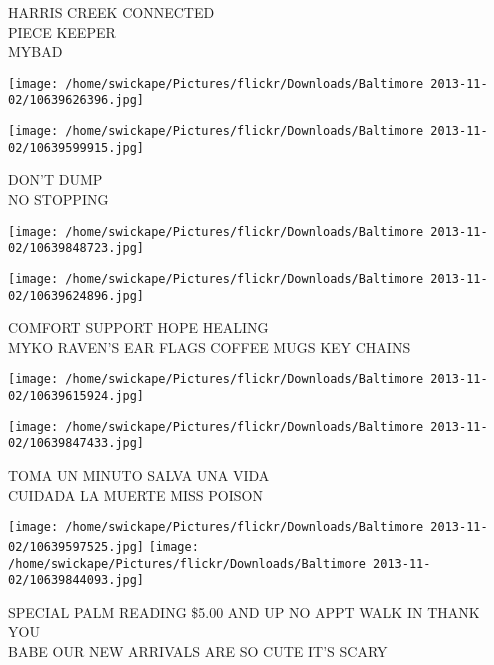 \documentclass[10pt,letterpaper]{article}
\begin{document}
HARRIS CREEK CONNECTED\\
PIECE KEEPER\\
MYBAD
\pagebreak

\texttt{[image: /home/swickape/Pictures/flickr/Downloads/Baltimore 2013-11-02/10639626396.jpg]}

\vspace{0.25in}
\texttt{[image: /home/swickape/Pictures/flickr/Downloads/Baltimore 2013-11-02/10639599915.jpg]}

DON'T DUMP\\
NO STOPPING
\pagebreak

\texttt{[image: /home/swickape/Pictures/flickr/Downloads/Baltimore 2013-11-02/10639848723.jpg]}

\vspace{0.25in}
\texttt{[image: /home/swickape/Pictures/flickr/Downloads/Baltimore 2013-11-02/10639624896.jpg]}

COMFORT SUPPORT HOPE HEALING\\
MYKO RAVEN'S EAR FLAGS COFFEE MUGS KEY CHAINS
\pagebreak

\texttt{[image: /home/swickape/Pictures/flickr/Downloads/Baltimore 2013-11-02/10639615924.jpg]}

\vspace{0.25in}
\texttt{[image: /home/swickape/Pictures/flickr/Downloads/Baltimore 2013-11-02/10639847433.jpg]}

TOMA UN MINUTO SALVA UNA VIDA\\
CUIDADA LA MUERTE MISS POISON
\pagebreak

\texttt{[image: /home/swickape/Pictures/flickr/Downloads/Baltimore 2013-11-02/10639597525.jpg]}
\texttt{[image: /home/swickape/Pictures/flickr/Downloads/Baltimore 2013-11-02/10639844093.jpg]}

SPECIAL PALM READING \$5.00 AND UP NO APPT WALK IN THANK YOU\\
BABE OUR NEW ARRIVALS ARE SO CUTE IT'S SCARY
\pagebreak
\end{document}
